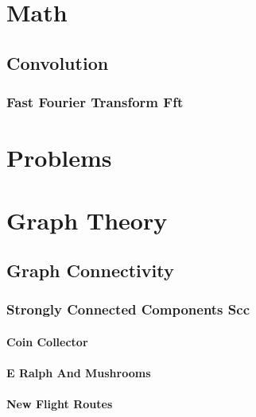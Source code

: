 \section{Math}
\subsection{Convolution}
\subsubsection{Fast Fourier Transform Fft}

\newpage

\appendix
\section{Problems}
\section{Graph Theory}
\subsection{Graph Connectivity}
\subsubsection{Strongly Connected Components Scc}
\paragraph{Coin Collector}


\paragraph{E Ralph And Mushrooms}


\paragraph{New Flight Routes}


